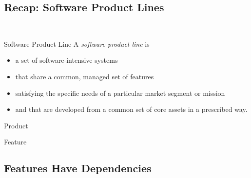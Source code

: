 \subsection{Recap: Software Product Lines}
\begin{frame}{\myframetitle\ \mytitlesource{\lectureintroduction}}
	\begin{fancycolumns}[t]
		\begin{definition}{Software Product Line }
			\mycitebegin A \emph{software product line} is 
			\begin{itemize}
				\item a set of software-intensive systems
				\item that share a common, managed set of features
				\item satisfying the specific needs of a particular market segment or mission
				\item and that are developed from a common set of core assets in a prescribed way.\myciteend
			\end{itemize}
		\end{definition}
		\begin{definition}{Product }
		\end{definition}
	\nextcolumn
		\begin{definition}{Feature }
		\end{definition}
		\centering{}
	\end{fancycolumns}
\end{frame}

\subsection{Features Have Dependencies}

